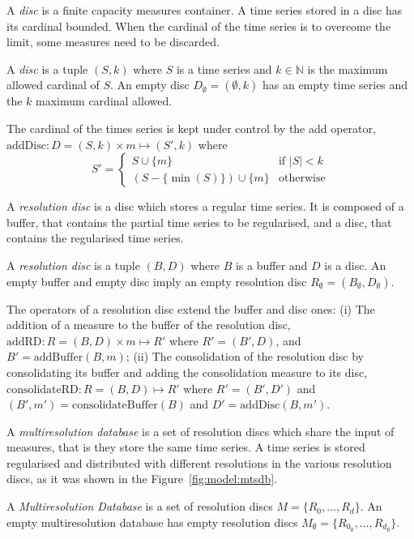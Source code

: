 A \emph{disc} is a finite capacity measures container. A time series
stored in a disc has its cardinal bounded. When the cardinal of the
time series is to overcome the limit, some measures need to be
discarded.
\begin{definition}[Disc]
  A \emph{disc} is a tuple $(S,k)$ where $S$ is a time series and
  $k\in\mathbb{N}$ is the maximum allowed cardinal of $S$.  An empty
  disc $D_{\emptyset} = (\emptyset,k)$ has an empty time series and
  the $k$ maximum cardinal allowed.
\end{definition}

The cardinal of the times series is kept under control by the add
operator, $\text{addDisc}:D=(S,k)\times m\mapsto (S',k)$ where 
$$
S' = \begin{cases}
  S\cup\{m\}                 & \text{if } |S|<k  \\
  (S-\{\min(S)\}) \cup \{m\} & \text{otherwise}
\end{cases}  
$$

A \emph{resolution disc} is a disc which stores a regular time
series. It is composed of a buffer, that contains the partial time
series to be regularised, and a disc, that contains the regularised
time series.
\begin{definition}
  A \emph{resolution disc} is a tuple $(B,D)$ where $B$ is a buffer
  and $D$ is a disc.  An empty buffer and empty disc imply an empty
  resolution disc $R_{\emptyset} = (B_{\emptyset},D_{\emptyset})$.
\end{definition}
 
The operators of a resolution disc extend the buffer and disc ones:
(i) The addition of a measure to the buffer of the resolution disc,
$\text{addRD}:R=(B,D) \times m \mapsto R'$ where $R'= (B',D)$, and
$B'= \text{addBuffer}(B,m)$; (ii) The consolidation of the resolution
disc by consolidating its buffer and adding the consolidation measure
to its disc, $\text{consolidateRD}:R=(B,D) \mapsto R'$ where $R'=
(B',D')$ and $(B',m') = \text{consolidateBuffer}(B)$ and $D'=
\text{addDisc}(B,m')$.

A \emph{multiresolution database} is a set of resolution discs which
share the input of measures, that is they store the same time
series. A time series is stored regularised and distributed with
different resolutions in the various resolution discs, as it was shown
in the Figure~\ref{fig:model:mtsdb}.
\begin{definition}
  A \emph{Multi\-re\-solution Database} is a set of resolution discs
  $M=\{R_0, \dots, R_d\}$.  An empty multiresolution database has
  empty resolution discs $M_{\emptyset}=\{R_{0_\emptyset}, \dots,
  R_{d_\emptyset}\}$.
\end{definition}

